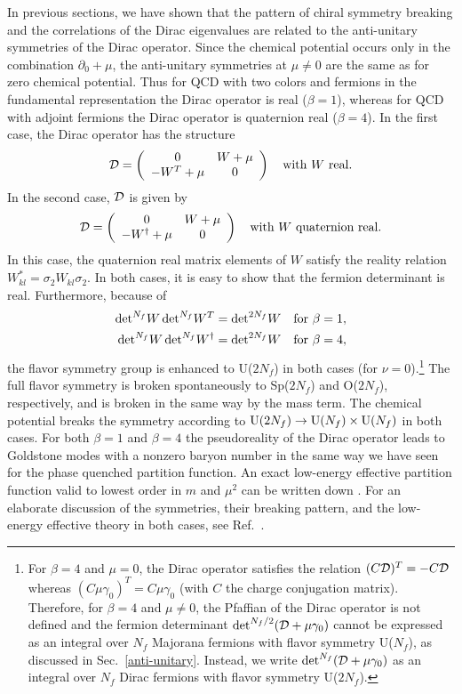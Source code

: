 In previous sections, we have shown that the pattern of chiral symmetry
breaking and the correlations of the Dirac eigenvalues are related to
the anti-unitary symmetries of the Dirac operator. Since the chemical
potential occurs only in the combination $\partial_0 + \mu$, the
anti-unitary symmetries at $\mu \ne 0$ are the same as for zero
chemical potential. Thus for QCD with two colors and fermions in the
fundamental representation the Dirac operator is
real ($\beta =1$), whereas for QCD with adjoint fermions the Dirac
operator is quaternion real ($\beta =4$). In the first case, the Dirac
operator has the structure \cite{Osbornmu}
\begin{equation}
  {\cal D} = \left ( \begin{array}{cc} 0 & W+ \mu \\ -W^T +\mu & 0 \end{array} \right ) \quad \hbox{with
  $W$ real}.
\end{equation}
In the second case, ${\cal D}$ is given by
\begin{equation}
  {\cal D} = \left ( \begin{array}{cc} 0 & W+ \mu \\ -W^\dagger +\mu & 0 \end{array} \right ) \quad 
  \hbox{with $W$ quaternion real}.
\end{equation}
In this case, the quaternion real matrix elements of $W$ satisfy the
reality relation $W_{kl}^* =\sigma_2 W_{kl} \sigma_2$. In both cases,
it is easy to show that the fermion determinant is real.
Furthermore, because of
\begin{eqnarray}
  {\det}^{N_f} W\,{\det}^{N_f} W^T = {\det}^{2N_f} W &&
  \hbox{for $\beta = 1$},\\
  {\det}^{N_f} W\,{\det}^{N_f} W^\dagger = {\det}^{2N_f} W &&
  \hbox{for $\beta = 4$},
\end{eqnarray}
the flavor symmetry group is enhanced to U($2N_f$) in both cases (for
$\nu=0$).\footnote{For $\beta=4$ and $\mu=0$, the Dirac operator
  satisfies the relation $(C{\cal D})^T=-C{\cal D}$ whereas
  $(C\mu\gamma_0)^T=C\mu\gamma_0$ (with $C$ the charge conjugation
  matrix).  Therefore, for $\beta =4$ and $\mu \ne 0$, the Pfaffian of
  the Dirac operator is not defined and the fermion determinant
  ${\det}^{N_f/2}({\cal D}+\mu\gamma_0)$ cannot be expressed as an
  integral over $N_f$ Majorana fermions with flavor symmetry U($N_f$),
  as discussed in Sec.~\ref{anti-unitary}.  Instead, we write
  ${\det}^{N_f}({\cal D}+\mu\gamma_0)$ as an integral over $N_f$ Dirac
  fermions with flavor symmetry U($2N_f$).}
The full flavor symmetry is broken spontaneously to
Sp($2N_f$) and O($2N_f$), respectively, and is broken in the same way
by the mass term. The chemical potential breaks the symmetry according
to ${\rm U}(2N_f) \rightarrow {\rm U}(N_f)\times {\rm U}(N_f)$ in both
cases.  For both 
$\beta =1 $ and $\beta=4$ the pseudoreality of the Dirac operator
leads to Goldstone modes with a nonzero baryon number in the same way
we have seen for the phase quenched partition function. An exact
low-energy effective partition function valid to lowest order in $m$
and $\mu^2$ can be written down \cite{KSTVZ}.  For an elaborate
discussion of the symmetries, their breaking pattern, and the
low-energy effective theory in both cases, see Ref.~\cite{KSTVZ}.

